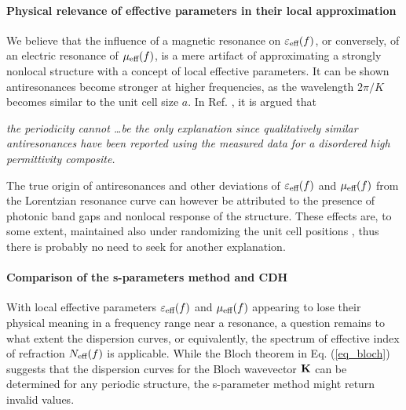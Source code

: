 \paragraph{Physical relevance of effective parameters in their local approximation}%
We believe that the influence of a magnetic resonance on $\varepsilon_{\text{eff} }(f)$, or conversely, of an electric resonance of $\mu_{\text{eff} }(f)$, is a mere artifact of approximating a strongly nonlocal structure with a concept of local effective parameters. It can be shown antiresonances become stronger at higher frequencies, as the wavelength $2\pi/K$ becomes similar to the unit cell size $a$. 
In Ref. \cite{wallen2011anti}, it is argued that %
\begin{displayquote}
\textit{the periodicity cannot \ldots be the only explanation since qualitatively similar antiresonances have been reported using the measured data for a disordered high permittivity composite.}
\end{displayquote}
The true origin of antiresonances and other deviations of $\varepsilon_{\text{eff} }(f)$ and $\mu_{\text{eff} }(f)$ from the Lorentzian resonance curve can however be attributed to the presence of photonic band gaps and nonlocal response of the structure. These effects are, to some extent, maintained also under randomizing the unit cell positions \cite{peng2007},   
thus there is probably no need to seek for another explanation. %


\paragraph{Comparison of the s-parameters method and CDH}%
With local effective parameters $\varepsilon_{\text{eff} }(f)$ and $\mu_{\text{eff} }(f)$ appearing to lose their physical meaning in a frequency range near a resonance, a question remains to what extent the dispersion curves, or equivalently, the spectrum of effective index of refraction $N_{\text{eff} }(f)$ is applicable. While the Bloch theorem in Eq. (\ref{eq_bloch}) suggests that the dispersion curves for the Bloch wavevector ${\mathbf{K}}$ can be determined for any periodic structure, the s-parameter method might return invalid values.


